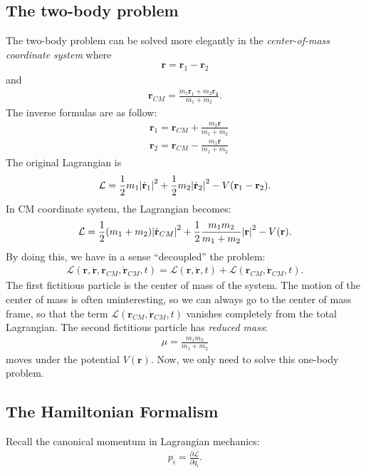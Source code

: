 \documentclass{book}
\theoremstyle{definition}
\newcommand{\p}{\partial}
\newcommand{\lag}{\mathcal{L}}
\newcommand{\f}[2]{\frac{#1}{#2}}
\begin{document}
\subsection{The two-body problem}
The two-body problem can be solved more elegantly in the \textit{center-of-mass coordinate system} where
\begin{align}
\mathbf{r} = \mathbf{r}_1 - \mathbf{r}_2
\end{align}
and 
\begin{align}
\mathbf{r}_{CM} = \f{m_1\mathbf{r}_1 + m_2\mathbf{r_2}}{m_1 + m_2}.
\end{align}
The inverse formulas are as follow:
\begin{align}
&\mathbf{r}_1 = \mathbf{r}_{CM} + \f{m_2\mathbf{r}}{m_1 + m_2}\\
&\mathbf{r}_2 = \mathbf{r}_{CM} - \f{m_1\mathbf{r}}{m_1 + m_2}
\end{align}
The original Lagrangian is
\begin{align}
\lag = \f{1}{2}m_1\abs{\dot{\mathbf{r}}_1}^2 + \f{1}{2}m_2\abs{\dot{\mathbf{r}}_2}^2 - V(\mathbf{r}_1 - \mathbf{r}_2). 
\end{align}
In CM coordinate system, the Lagrangian becomes:
\begin{align}
\lag =\f{1}{2}(m_1 + m_2)\abs{\dot{\mathbf{r}}_{CM}}^2 + \f{1}{2}\f{m_1m_2}{m_1+m_2}\abs{\mathbf{r}}^2 - V(\mathbf{r}).
\end{align}
By doing this, we have in a sense ``decoupled'' the problem:
\begin{align}
\lag(\mathbf{r},\dot{\mathbf{r}}, \mathbf{r}_{CM}, \dot{\mathbf{r}}_{CM},t) = \lag(\mathbf{r},\dot{\mathbf{r}},t) + \lag(\mathbf{r}_{CM}, \dot{\mathbf{r}}_{CM},t).
\end{align}
The first fictitious particle is the center of mass of the system. The motion of the center of mass is often uninteresting, so we can always go to the center of mass frame, so that the term $\lag(\mathbf{r}_{CM}, \dot{\mathbf{r}}_{CM},t)$ vanishes completely from the total Lagrangian. The second fictitious particle has \textit{reduced mass}:
\begin{align}
\mu = \f{m_1m_2}{m_1+m_2}
\end{align}
moves under the potential $V(\mathbf{r})$. Now, we only need to solve this one-body problem. 


\subsection{The Hamiltonian Formalism}
Recall the canonical momentum in Lagrangian mechanics:
\begin{align}
p_i = \f{\p \lag}{\p \dot{q}_i}.
\end{align}
\end{document}
